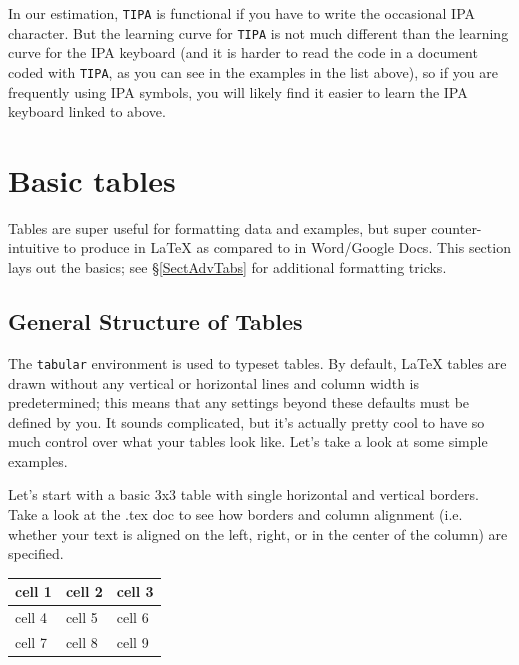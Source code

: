 \documentclass{article}
\begin{document}
\noindent In our estimation, \texttt{TIPA} is functional if you have to write the occasional IPA character. But the learning curve for \texttt{TIPA} is not much different than the learning curve for the IPA keyboard (and it is harder to read the code in a document coded with \texttt{TIPA}, as you can see in the examples in the list above), so if you are frequently using IPA symbols, you will likely find it easier to learn the IPA keyboard linked to above.

\section{Basic tables}

Tables are super useful for formatting data and examples, but super counter-intuitive to produce in \LaTeX{} as compared to in Word/Google Docs. This section lays out the basics; see \S\ref{SectAdvTabs} for additional formatting tricks.

\subsection{General Structure of Tables}\label{SectGenTables}

The \texttt{tabular} environment is used to typeset tables. By default, \LaTeX{} tables are drawn without any vertical or horizontal lines and column width is predetermined; this means that any settings beyond these defaults must be defined by you. It sounds complicated, but it's actually pretty cool to have so much control over what your tables look like. Let's take a look at some simple examples.

Let's start with a basic 3x3 table with single horizontal and vertical borders. Take a look at the .tex doc to see how borders and column alignment (i.e. whether your text is aligned on the left, right, or in the center of the column) are specified. 


\begin{tabular}{|l|l|l|} 
\hline 
cell 1 & cell 2 & cell 3 \\ 
\hline
cell 4 & cell 5 & cell 6 \\
\hline
cell 7 & cell 8 & cell 9 \\
\hline
\end{tabular}
\end{document}
